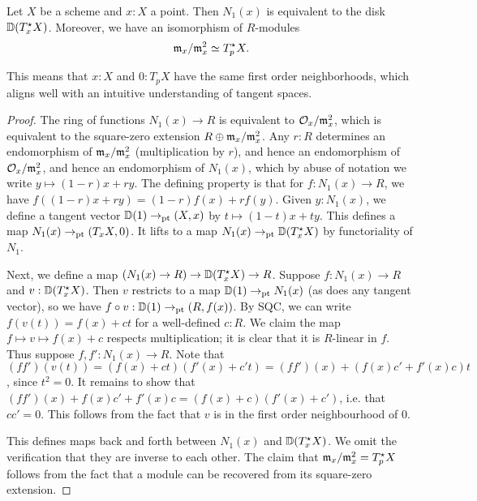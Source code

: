 \begin{lemma}\label{maximal-cotangent}
Let $X$ be a scheme and $x : X$ a point. 
Then $N_1(x)$ is equivalent to the
disk $\mathbb{D}(T^\star_x X)$. Moreover, we have an isomorphism
of $R$-modules
\[ \mathfrak{m}_x / \mathfrak{m}_x^2 \simeq T^\star_p X. \]
\end{lemma}
This means that $x : X$ and $0 : T_p X$ have the same first order neighborhoods,
which aligns well with an intuitive understanding of tangent spaces.
\begin{proof} %
The ring of functions $N_1(x) \to R$ is equivalent to
$\mathcal{O}_x / \mathfrak{m}_x^2$, which is equivalent to the square-zero extension
$R \oplus \mathfrak{m}_x / \mathfrak{m}_x^2$. Any $r : R$ determines an endomorphism of
$\mathfrak{m}_x / \mathfrak{m}_x^2$ (multiplication by $r$), and hence an endomorphism
of $\mathcal{O}_x / \mathfrak{m}_x^2$, and hence an endomorphism of $N_1(x)$, which
by abuse of notation we write $y \mapsto (1-r)x + ry$. 
The defining property is that
for $f : N_1(x) \to R$, we have $f((1-r)x + ry) = (1-r)f(x) + rf(y)$.
Given $y : N_1(x)$,
we define a tangent vector $\mathbb{D}(1) \to_{\mathrm{pt}} (X,x)$ by $t \mapsto (1-t)x + ty$.
This defines a map $N_1(x) \to_{\mathrm{pt}} (T_x X, 0)$. It lifts to
a map $N_1(x) \to_{\mathrm{pt}} \mathbb{D}(T^\star_x X)$ by functoriality of $N_1$.

Next, we define a map $(N_1(x) \to R) \to \mathbb{D}(T^\star_x X) \to R$.
Suppose $f : N_1(x) \to R$ and $v : \mathbb{D}(T^\star_x X)$.
Then $v$ restricts to a map $\mathbb{D}(1) \to_{\mathrm{pt}} N_1(x)$
(as does any tangent vector),
so we have $f \circ v : \mathbb{D}(1) \to_{\mathrm{pt}} (R,f(x))$.
By SQC, we can write $f(v(t)) = f(x) + ct$ for a well-defined $c : R$.
We claim the map $f \mapsto v \mapsto f(x) + c$ respects multiplication;
it is clear that it is $R$-linear in $f$. Thus suppose $f, f' : N_1(x) \to R$.
Note that $(ff')(v(t)) = (f(x) + ct)(f'(x)+c't) = (ff')(x) + (f(x)c' + f'(x)c)t$,
since $t^2 = 0$. It remains to show that
$(ff')(x) + f(x)c' + f'(x)c = (f(x) + c)(f'(x) + c')$, i.e. that
$cc' = 0$. This follows from the fact that $v$ is in the first order neighbourhood
of $0$.

This defines maps back and forth between
$N_1(x)$ and $\mathbb{D}(T^\star_x X)$. We omit the verification that they are inverse to
each other. The claim that $\mathfrak{m}_x / \mathfrak{m}_x^2 = T^\star_p X$ follows from the
fact that a module can be recovered from its square-zero extension.
\end{proof}

